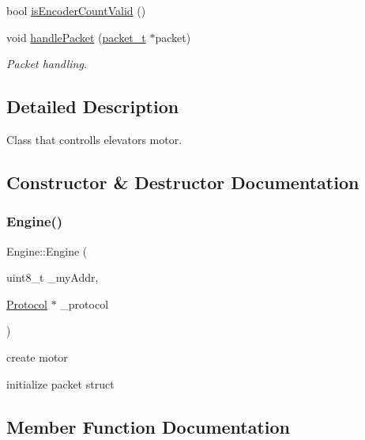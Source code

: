 \begin{DoxyCompactItemize}
bool \hyperlink{classEngine_a59e303aa687c5f97bc6c2c4c93c373a5}{is\+Encoder\+Count\+Valid} ()
\item 
void \hyperlink{classEngine_ab531b7c3575d1e979642e17b2b861416}{handle\+Packet} (\hyperlink{structpacket__t}{packet\+\_\+t} $\ast$packet)
\begin{DoxyCompactList}\small\item\em Packet handling. \end{DoxyCompactList}\end{DoxyCompactItemize}


\subsection{Detailed Description}
Class that controlls elevator\textquotesingle{}s motor. 

\subsection{Constructor \& Destructor Documentation}
\mbox{\label{classEngine_a38f43c750e038ee25889e3643ef1f599}} 
\subsubsection{\texorpdfstring{Engine()}{Engine()}}
{\footnotesize\ttfamily Engine\+::\+Engine (\begin{DoxyParamCaption}\item[{uint8\+\_\+t}]{\+\_\+my\+Addr,  }\item[{\hyperlink{classProtocol}{Protocol} $\ast$}]{\+\_\+protocol }\end{DoxyParamCaption})\hspace{0.3cm}{\ttfamily [inline]}}



create motor 

initialize packet struct 

\subsection{Member Function Documentation}
\mbox{\label{classEngine_a1bbe0026794f4fb38599d64aeaca399f}} 
